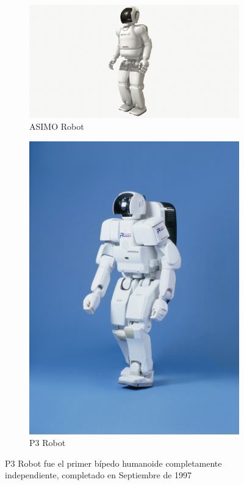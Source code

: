 \begin{figure}[H]
	\centering
	\begin{subfigure}[b]{0.5\textwidth}
		\centering
		\includegraphics[width=\textwidth]{images/ASIMO.jpg}
		\caption{ASIMO Robot}
		\label{fig:image1}
	\end{subfigure}
	\hfill
	\begin{subfigure}[b]{0.24\textwidth}
		\centering
		\includegraphics[width=\textwidth]{images/P3_robot.jpg}
		\caption{P3 Robot}
		\label{fig:image2}
	\end{subfigure}
	\caption{P3 Robot fue el primer bípedo humanoide completamente independiente, completado en Septiembre de 1997}
	\label{fig:parallel_images}
\end{figure}

